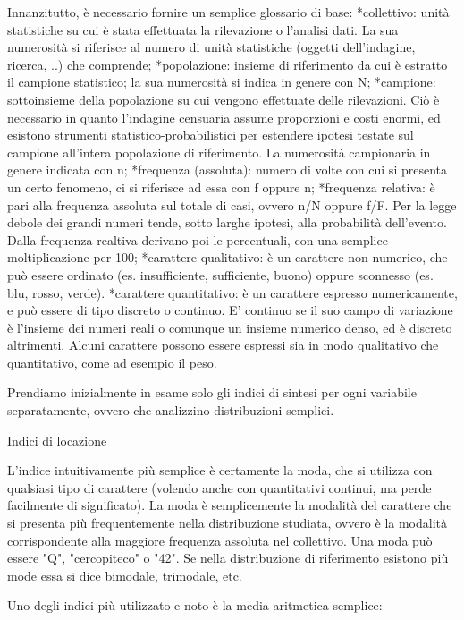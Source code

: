 \documentclass{book}
\begin{document}
Innanzitutto, è necessario fornire un semplice glossario di base:
*collettivo: unità statistiche su cui è stata effettuata la rilevazione o l'analisi dati. La sua numerosità si riferisce al numero di unità statistiche (oggetti dell'indagine, ricerca, ..) che comprende;
*popolazione: insieme di riferimento da cui è estratto il campione statistico; la sua numerosità si indica in genere con N;
*campione: sottoinsieme della popolazione su cui vengono effettuate delle rilevazioni. Ciò è necessario in quanto l'indagine censuaria assume proporzioni e costi enormi, ed esistono strumenti statistico-probabilistici per estendere ipotesi testate sul campione all'intera popolazione di riferimento. La numerosità campionaria in genere indicata con n;
*frequenza (assoluta): numero di volte con cui si presenta un certo fenomeno, ci si riferisce ad essa con f oppure n;
*frequenza relativa: è pari alla frequenza assoluta sul totale di casi, ovvero n/N oppure f/F. Per la legge debole dei grandi numeri tende, sotto larghe ipotesi, alla probabilità dell'evento. Dalla frequenza realtiva derivano poi le percentuali, con una semplice moltiplicazione per 100;
*carattere qualitativo: è un carattere non numerico, che può essere ordinato (es. insufficiente, sufficiente, buono) oppure sconnesso (es. blu, rosso, verde).
*carattere quantitativo: è un carattere espresso numericamente, e può essere di tipo discreto o continuo. E' continuo se il suo campo di variazione è l'insieme dei numeri reali o comunque un insieme numerico denso, ed è discreto altrimenti. Alcuni carattere possono essere espressi sia in modo qualitativo che quantitativo, come ad esempio il peso.

Prendiamo inizialmente in esame solo gli indici di sintesi per ogni variabile separatamente, ovvero che analizzino distribuzioni semplici.

Indici di locazione

L'indice intuitivamente più semplice è certamente la moda, che si utilizza con qualsiasi tipo di carattere (volendo anche con quantitativi continui, ma perde facilmente di significato).
La moda è semplicemente la modalità del carattere che si presenta più frequentemente nella distribuzione studiata, ovvero è la modalità corrispondente alla maggiore frequenza assoluta nel collettivo.
Una moda può essere "Q", "cercopiteco" o "42". Se nella distribuzione di riferimento esistono più mode essa si dice bimodale, trimodale, etc.

Uno degli indici più utilizzato e noto è la media aritmetica semplice:
\end{document}
